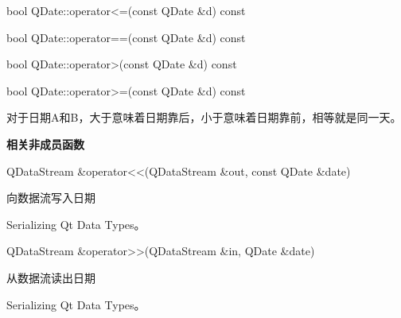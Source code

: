 bool QDate::operator<=(const QDate \&d) const

bool QDate::operator==(const QDate \&d) const

bool QDate::operator>(const QDate \&d) const

bool QDate::operator>=(const QDate \&d) const

对于日期A和B，大于意味着日期靠后，小于意味着日期靠前，相等就是同一天。

\splitLine


\textbf{相关非成员函数}

QDataStream \&operator<<(QDataStream \&out, const QDate \&date)

向数据流写入日期


\begin{notice}[另请参阅]
Serializing Qt Data Types。
\end{notice}

QDataStream \&operator>>(QDataStream \&in, QDate \&date)

从数据流读出日期

\begin{notice}[另请参阅]
Serializing Qt Data Types。
\end{notice}